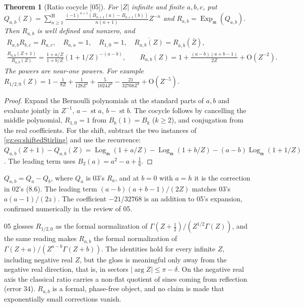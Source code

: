 \documentclass[11pt,a4paper]{article}
\numberwithin{equation}{section}
\newtheorem{theorem}{Theorem}[section]
\theoremstyle{definition}
\theoremstyle{remark}
\newcommand{\mm}{\mathfrak m}
\newcommand{\st}{\operatorname{st}}
\newcommand{\Ex}{\operatorname{Exp}_{\mm}}
\newcommand{\Lgm}{\operatorname{Log}_{\mm}}
\newcommand{\Sh}{\mathop{\textstyle\sum}\nolimits^{\mathrm H}}
\newcommand{\src}[1]{\textup{[#1]}}
\newcommand{\bigO}{\mathrm{O}}
\begin{document}
\begin{theorem}[Ratio cocycle \src{05}]\label{gz:thm:cocycle}
For $|Z|$ infinite and finite $a,b,c$, put
$Q_{a,b}(Z)=\Sh_{n\ge1}\frac{(-1)^{n+1}(B_{n+1}(a)-B_{n+1}(b))}{n(n+1)}Z^{-n}$
and $R_{a,b}=\Ex(Q_{a,b})$. Then $R_{a,b}$ is well defined and nonzero, and
\begin{gather*}
R_{a,b}R_{b,c}=R_{a,c},\quad R_{a,a}=1,\quad R_{1,0}=1,\quad
\overline{R_{a,b}(Z)}=R_{\bar a,\bar b}(\bar Z),\\
\frac{R_{a,b}(Z+1)}{R_{a,b}(Z)}=\frac{1+a/Z}{1+b/Z}(1+1/Z)^{-(a-b)},\qquad
R_{a,b}(Z)=1+\frac{(a-b)(a+b-1)}{2Z}+\bigO(Z^{-2}).
\end{gather*}
The powers are near-one powers. For example
$R_{1/2,0}(Z)=1-\frac1{8Z}+\frac1{128Z^2}+\frac5{1024Z^3}-\frac{21}{32768Z^4}+\bigO(Z^{-5})$.
\end{theorem}
\begin{proof}
Expand the Bernoulli polynomials at the standard parts of $a,b$ and evaluate
jointly in $Z^{-1}$, $a-\st a$, $b-\st b$. The cocycle follows by cancelling
the middle polynomial, $R_{1,0}=1$ from $B_k(1)=B_k$ ($k\ge2$), and
conjugation from the real coefficients. For the shift, subtract the two
instances of \eqref{gz:eq:shiftedStirling} and use the recurrence:
$Q_{a,b}(Z+1)-Q_{a,b}(Z)=\Lgm(1+a/Z)-\Lgm(1+b/Z)-(a-b)\Lgm(1+1/Z)$. The leading
term uses $B_2(a)=a^2-a+\tfrac16$.
\end{proof}
$Q_{a,b}=Q_a-Q_b$, where $Q_a$ is 03's $R_a$, and at $b=0$ with $a=h$ it is
the correction in 02's (8.6). The leading term $(a-b)(a+b-1)/(2Z)$ matches
03's $a(a-1)/(2z)$. The coefficient $-21/32768$ is an addition to 05's
expansion, confirmed numerically in the review of 05.
\begin{remark}[Reading $R_{a,b}$ as a Gamma ratio \src{05}]\label{gz:rem:cocycle-gloss}
05 glosses $R_{1/2,0}$ as the formal normalization of
$\Gamma(Z+\tfrac12)/(Z^{1/2}\Gamma(Z))$, and the same reading makes
$R_{a,b}$ the formal normalization of $\Gamma(Z+a)/(Z^{a-b}\Gamma(Z+b))$. The identities hold for every infinite
$Z$, including negative real $Z$, but the gloss is meaningful only away from
the negative real direction, that is, in sectors $|\arg Z|\le\pi-\delta$.
On the negative real axis the classical ratio carries a non-flat quotient
of sines coming from reflection (error 34). $R_{a,b}$ is a formal, phase-free
object, and no claim is made that exponentially small corrections vanish.
\end{remark}
\end{document}
